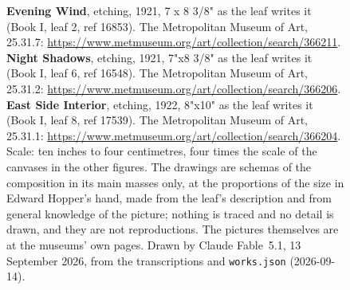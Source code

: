 \begin{figure}[htbp]
\caption{\textbf{Evening Wind}, etching, 1921, 7 x 8 3/8" as the leaf writes it (Book I, leaf 2, ref 16853). The Metropolitan Museum of Art, 25.31.7: \url{https://www.metmuseum.org/art/collection/search/366211}. \textbf{Night Shadows}, etching, 1921, 7"x8 3/8" as the leaf writes it (Book I, leaf 6, ref 16548). The Metropolitan Museum of Art, 25.31.2: \url{https://www.metmuseum.org/art/collection/search/366206}. \textbf{East Side Interior}, etching, 1922, 8"x10" as the leaf writes it (Book I, leaf 8, ref 17539). The Metropolitan Museum of Art, 25.31.1: \url{https://www.metmuseum.org/art/collection/search/366204}. Scale: ten inches to four centimetres, four times the scale of the canvases in the other figures. The drawings are schemas of the composition in its main masses only, at the proportions of the size in Edward Hopper's hand, made from the leaf's description and from general knowledge of the picture; nothing is traced and no detail is drawn, and they are not reproductions. The pictures themselves are at the museums' own pages. Drawn by Claude Fable~5.1, 13 September 2026, from the transcriptions and \texttt{works.json} (2026-09-14).}\label{fig:etchings}
\end{figure}
